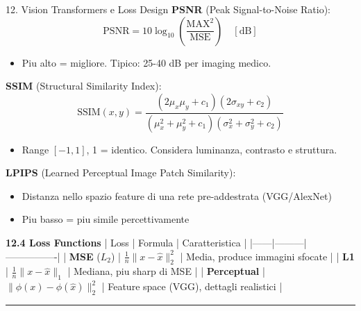 \documentclass[italian,10pt]{beamer}
\begin{document}
\begin{frame}[allowframebreaks]{12. Vision Transformers e Loss Design}
\textbf{PSNR} (Peak Signal-to-Noise Ratio):
\[ \text{PSNR} = 10 \log_{10}\left(\frac{\text{MAX}^2}{\text{MSE}}\right) \quad [\text{dB}] \]
\begin{itemize}
\item Piu alto = migliore. Tipico: 25-40 dB per imaging medico.
\end{itemize}
\textbf{SSIM} (Structural Similarity Index):
\[ \text{SSIM}(x,y) = \frac{(2\mu_x\mu_y + c_1)(2\sigma_{xy} + c_2)}{(\mu_x^2 + \mu_y^2 + c_1)(\sigma_x^2 + \sigma_y^2 + c_2)} \]
\begin{itemize}
\item Range $[-1, 1]$, 1 = identico. Considera luminanza, contrasto e struttura.
\end{itemize}
\textbf{LPIPS} (Learned Perceptual Image Patch Similarity):
\begin{itemize}
\item Distanza nello spazio feature di una rete pre-addestrata (VGG/AlexNet)
\item Piu basso = piu simile percettivamente
\end{itemize}
\textbf{12.4 Loss Functions}
| Loss | Formula | Caratteristica |
|------|---------|----------------|
| \textbf{MSE} ($L_2$) | $\frac{1}{n}\|x - \hat{x}\|_2^2$ | Media, produce immagini sfocate |
| \textbf{L1} | $\frac{1}{n}\|x - \hat{x}\|_1$ | Mediana, piu sharp di MSE |
| \textbf{Perceptual} | $\|\phi(x) - \phi(\hat{x})\|_2^2$ | Feature space (VGG), dettagli realistici |
\medskip\noindent\rule{\textwidth}{0.4pt}\medskip
\end{frame}
\end{document}

